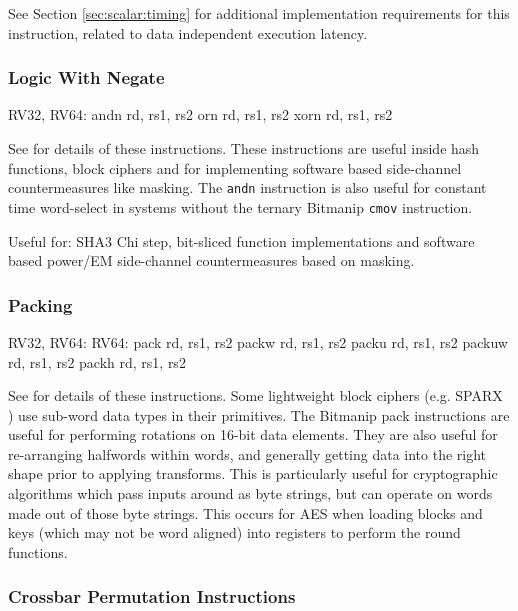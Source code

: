 See Section \ref{sec:scalar:timing} for additional implementation
requirements for this instruction, related to data independent
execution latency.

\subsubsection{Logic With Negate}

\begin{cryptobitmanipisa}
RV32, RV64:
    andn rd, rs1, rs2
     orn rd, rs1, rs2
    xorn rd, rs1, rs2
\end{cryptobitmanipisa}

See \cite[Section 2.1.3]{riscv:bitmanip:draft} for details of
these instructions.
These instructions are useful inside hash functions, block ciphers and
for implementing software based side-channel countermeasures like masking.
The {\tt andn} instruction is also useful for constant time word-select
in systems without the ternary Bitmanip {\tt cmov} instruction.

Useful for:
SHA3 Chi step,
bit-sliced function implementations
and
software based power/EM side-channel countermeasures based on masking.

\subsubsection{Packing}

\begin{cryptobitmanipisa}
RV32, RV64:                         RV64: 
    pack   rd, rs1, rs2                 packw  rd, rs1, rs2
    packu  rd, rs1, rs2                 packuw rd, rs1, rs2
    packh  rd, rs1, rs2
\end{cryptobitmanipisa}

See \cite[Section 2.1.4]{riscv:bitmanip:draft} for details of
these instructions.
Some lightweight block ciphers
(e.g. SPARX \cite{DPUVGB:16})
use sub-word data types in their primitives.
The Bitmanip pack instructions are useful for performing rotations on
16-bit data elements.
They are also useful for re-arranging halfwords within words, and
generally getting data into the right shape prior to applying transforms.
This is particularly useful for cryptographic algorithms which pass inputs
around as byte strings, but can operate on words made out of those byte
strings.
This occurs for AES when loading blocks and keys (which may not be
word aligned) into registers to perform the round functions.


\subsubsection{Crossbar Permutation Instructions}
\label{sec:xperm}

